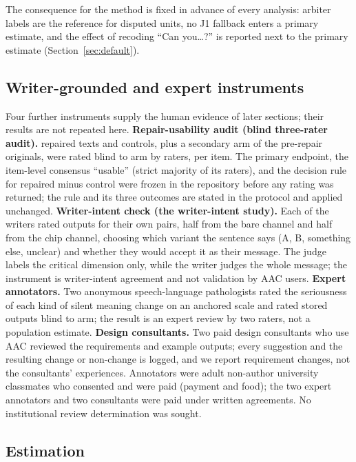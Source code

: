 The consequence for the method is fixed in advance of every analysis: arbiter labels are the reference for disputed units, no J1 fallback enters a primary estimate, and the effect of recoding ``Can you\ldots?'' is reported next to the primary estimate (Section~\ref{sec:default}).

\subsection{Writer-grounded and expert instruments}\label{sec:m-instruments}

Four further instruments supply the human evidence of later sections; their results are not repeated here.
\textbf{Repair-usability audit (blind three-rater audit).}
\jmpOneSevenItemsPerArm{} repaired texts and \jmpOneSevenItemsPerArm{} controls, plus a secondary arm of the pre-repair originals, were rated blind to arm by \jmpOneSevenRaters{} raters, \jmpOneSevenPerItem{} per item.
The primary endpoint, the item-level consensus ``usable'' (strict majority of its raters), and the decision rule for repaired minus control were frozen in the repository before any rating was returned; the rule and its three outcomes are stated in the protocol and applied unchanged.
\textbf{Writer-intent check (the writer-intent study).}
Each of the \jmpOneEightWriters{} writers rated \jmpOneEightPerWriter{} outputs for their own pairs, half from the bare channel and half from the chip channel, choosing which variant the sentence says (A, B, something else, unclear) and whether they would accept it as their message.
The judge labels the critical dimension only, while the writer judges the whole message; the instrument is writer-intent agreement and not validation by AAC users.
\textbf{Expert annotators.}
Two anonymous speech-language pathologists rated the seriousness of each kind of silent meaning change on an anchored scale and rated stored outputs blind to arm; the result is an expert review by two raters, not a population estimate.
\textbf{Design consultants.}
Two paid design consultants who use AAC reviewed the requirements and example outputs; every suggestion and the resulting change or non-change is logged, and we report requirement changes, not the consultants' experiences.
Annotators were adult non-author university classmates who consented and were paid (payment and food); the two expert annotators and two consultants were paid under written agreements.
No institutional review determination was sought.

\subsection{Estimation}\label{sec:m-est}

